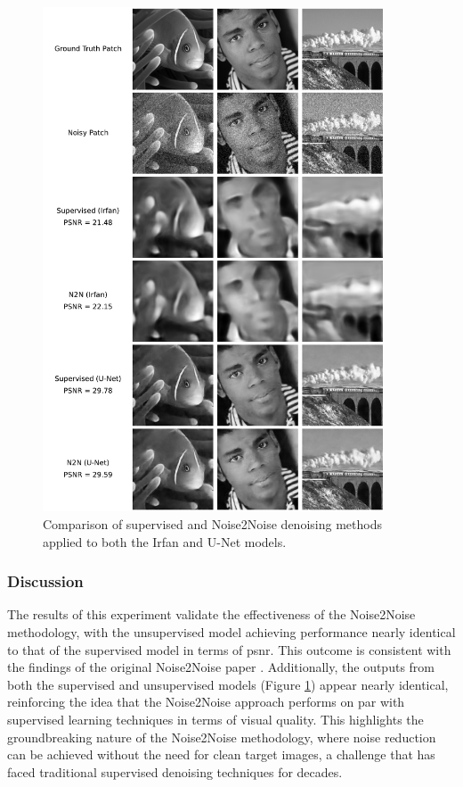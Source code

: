 \begin{figure}[p]
    \centering
    \includegraphics[width=0.9\textwidth]{img/ch6/n2n_imagenet/denoising_comparison_2.pdf}
    \caption{Comparison of supervised and Noise2Noise denoising methods applied to both the Irfan and U-Net models.}
    \label{fig:n2n-vs-supervised}
\end{figure}

\subsubsection{Discussion}

The results of this experiment validate the effectiveness of the Noise2Noise methodology, with the unsupervised model achieving performance nearly identical to that of the supervised model in terms of \acrshort{psnr}. This outcome is consistent with the findings of the original Noise2Noise paper \cite{lehtinen_noise2noise_2018}. Additionally, the outputs from both the supervised and unsupervised models (Figure \ref{fig:n2n-vs-supervised}) appear nearly identical, reinforcing the idea that the Noise2Noise approach performs on par with supervised learning techniques in terms of visual quality. This highlights the groundbreaking nature of the Noise2Noise methodology, where noise reduction can be achieved without the need for clean target images, a challenge that has faced traditional supervised denoising techniques for decades.

